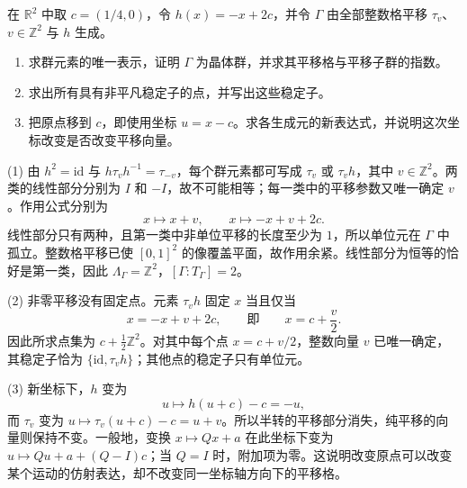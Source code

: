 \begin{exercise}
	\label{g1:ex:translated-halfturn-group}
	在 \(\mathbb R^2\) 中取 \(c=(1/4,0)\)，令 \(h(x)=-x+2c\)，并令 \(\Gamma\) 由全部整数格平移 \(\tau_v\)、\(v\in\mathbb Z^2\) 与 \(h\) 生成。
	\begin{enumerate}
		\item 求群元素的唯一表示，证明 \(\Gamma\) 为晶体群，并求其平移格与平移子群的指数。
		\item 求出所有具有非平凡稳定子的点，并写出这些稳定子。
		\item 把原点移到 \(c\)，即使用坐标 \(u=x-c\)。求各生成元的新表达式，并说明这次坐标改变是否改变平移向量。
	\end{enumerate}
\end{exercise}
\begin{solution}
	(1) 由 \(h^2=\mathrm{id}\) 与 \(h\tau_vh^{-1}=\tau_{-v}\)，每个群元素都可写成 \(\tau_v\) 或 \(\tau_vh\)，其中 \(v\in\mathbb Z^2\)。两类的线性部分分别为 \(I\) 和 \(-I\)，故不可能相等；每一类中的平移参数又唯一确定 \(v\)。作用公式分别为
	\[
		x\longmapsto x+v,\qquad x\longmapsto -x+v+2c.
	\]
	线性部分只有两种，且第一类中非单位平移的长度至少为 \(1\)，所以单位元在 \(\Gamma\) 中孤立。整数格平移已使 \([0,1]^2\) 的像覆盖平面，故作用余紧。线性部分为恒等的恰好是第一类，因此 \(\Lambda_\Gamma=\mathbb Z^2\)，\([\Gamma:T_\Gamma]=2\)。

	(2) 非零平移没有固定点。元素 \(\tau_vh\) 固定 \(x\) 当且仅当
	\[
		x=-x+v+2c,\qquad\text{即}\qquad x=c+\frac v2.
	\]
	因此所求点集为 \(c+\tfrac12\mathbb Z^2\)。对其中每个点 \(x=c+v/2\)，整数向量 \(v\) 已唯一确定，其稳定子恰为 \(\{\mathrm{id},\tau_vh\}\)；其他点的稳定子只有单位元。

	(3) 新坐标下，\(h\) 变为
	\[
		u\longmapsto h(u+c)-c=-u,
	\]
	而 \(\tau_v\) 变为 \(u\mapsto\tau_v(u+c)-c=u+v\)。所以半转的平移部分消失，纯平移的向量则保持不变。一般地，变换 \(x\mapsto Qx+a\) 在此坐标下变为 \(u\mapsto Qu+a+(Q-I)c\)；当 \(Q=I\) 时，附加项为零。这说明改变原点可以改变某个运动的仿射表达，却不改变同一坐标轴方向下的平移格。
\end{solution}


